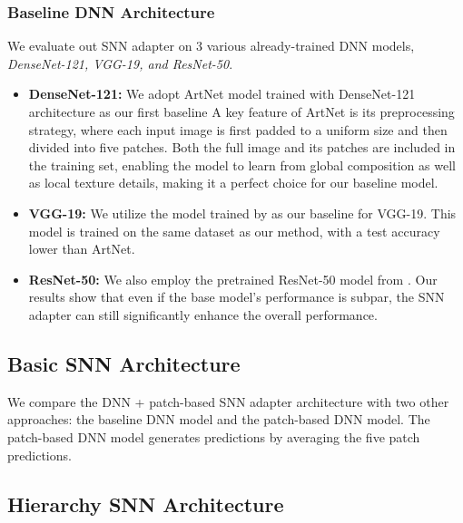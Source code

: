 \subsubsection{Baseline DNN Architecture}We evaluate out SNN adapter on 3 various already-trained DNN models, \textit{DenseNet-121, VGG-19, and ResNet-50}. 
\begin{itemize}
    \item \textbf{DenseNet-121:} We adopt ArtNet model\cite{artnet} trained with DenseNet-121 architecture as our first baseline A key feature of ArtNet is its preprocessing
strategy, where each input image is first padded to a uniform
size and then divided into five patches. Both the full image
and its patches are included in the training set, enabling the
model to learn from global composition as well as local texture details, making it 
a perfect choice for our baseline model.
\item \textbf{VGG-19:} We utilize the model trained by \cite{qchaldemer2023paintingclassification} as our baseline for VGG-19. This model is trained on the same dataset as our method, with a test accuracy lower than ArtNet.
\item \textbf{ResNet-50:} We also employ the pretrained ResNet-50 model from \cite{kayracoskun2023artstyleclassification}. Our results show that even if the base model's performance is subpar, the SNN adapter can still significantly enhance the overall performance.
\end{itemize}

\subsection{Basic SNN Architecture}
We compare the DNN + patch-based SNN adapter architecture with two other approaches: the baseline DNN model and the patch-based DNN model. The patch-based DNN model generates predictions by averaging the five patch predictions.

\subsection{Hierarchy SNN Architecture}

